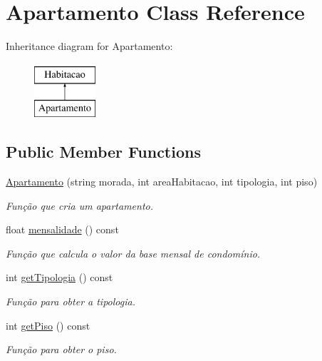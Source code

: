 \hypertarget{class_apartamento}{}\section{Apartamento Class Reference}
\label{class_apartamento}
Inheritance diagram for Apartamento\+:\begin{figure}[H]
\begin{center}
\leavevmode
\includegraphics[height=2.000000cm]{class_apartamento}
\end{center}
\end{figure}
\subsection*{Public Member Functions}
\begin{DoxyCompactItemize}
\item 
\hyperlink{class_apartamento_ae5b9a8701fd002ea97962d4e7b3ace87}{Apartamento} (string morada, int area\+Habitacao, int tipologia, int piso)
\begin{DoxyCompactList}\small\item\em Função que cria um apartamento. \end{DoxyCompactList}\item 
float \hyperlink{class_apartamento_a3626df5dabd6871c5f9fce39e8c70249}{mensalidade} () const 
\begin{DoxyCompactList}\small\item\em Função que calcula o valor da base mensal de condomínio. \end{DoxyCompactList}\item 
int \hyperlink{class_apartamento_a8f933db9b6eb43fc714246e30b4bcf24}{get\+Tipologia} () const 
\begin{DoxyCompactList}\small\item\em Função para obter a tipologia. \end{DoxyCompactList}\item 
int \hyperlink{class_apartamento_a63f2569f807dc98bb632b4830ed18af4}{get\+Piso} () const 
\begin{DoxyCompactList}\small\item\em Função para obter o piso. \end{DoxyCompactList}\end{DoxyCompactItemize}


